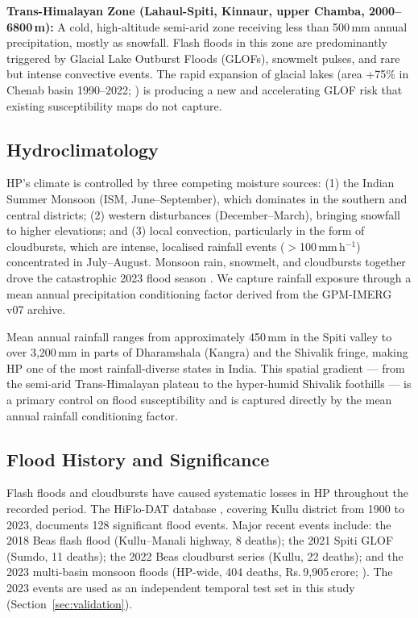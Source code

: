 \textbf{Trans-Himalayan Zone (Lahaul-Spiti, Kinnaur, upper Chamba, 2000--6800\,m):}
A cold, high-altitude semi-arid zone receiving less than 500\,mm annual precipitation,
mostly as snowfall.
Flash floods in this zone are predominantly triggered by Glacial Lake Outburst Floods (GLOFs),
snowmelt pulses, and rare but intense convective events.
The rapid expansion of glacial lakes (area +75\% in Chenab basin 1990--2022;
\citealt{chenab2024glof}) is producing a new and accelerating GLOF risk
that existing susceptibility maps do not capture.

\subsection{Hydroclimatology}
\label{sec:climate}

HP's climate is controlled by three competing moisture sources:
(1) the Indian Summer Monsoon (ISM, June--September), which dominates in the
southern and central districts;
(2) western disturbances (December--March), bringing snowfall to higher elevations; and
(3) local convection, particularly in the form of cloudbursts,
which are intense, localised rainfall events ($>$100\,mm\,h$^{-1}$)
concentrated in July--August.
Monsoon rain, snowmelt, and cloudbursts together drove the catastrophic 2023 flood season
\citep{dixit2026nhess}. We capture rainfall exposure through a mean annual precipitation
conditioning factor derived from the GPM-IMERG v07 archive.

Mean annual rainfall ranges from approximately 450\,mm in the Spiti valley
to over 3,200\,mm in parts of Dharamshala (Kangra) and the Shivalik fringe,
making HP one of the most rainfall-diverse states in India.
This spatial gradient --- from the semi-arid Trans-Himalayan plateau to the
hyper-humid Shivalik foothills --- is a primary control on flood susceptibility
and is captured directly by the mean annual rainfall conditioning factor.

\subsection{Flood History and Significance}
\label{sec:flood_history}

Flash floods and cloudbursts have caused systematic losses in HP throughout
the recorded period.
The HiFlo-DAT database \citep{hiflodot2025}, covering Kullu district from 1900 to 2023,
documents 128 significant flood events.
Major recent events include:
the 2018 Beas flash flood (Kullu--Manali highway, 8 deaths);
the 2021 Spiti GLOF (Sumdo, 11 deaths);
the 2022 Beas cloudburst series (Kullu, 22 deaths);
and the 2023 multi-basin monsoon floods (HP-wide, 404 deaths, Rs.\,9,905\,crore;
\citealt{ndma2023}).
The 2023 events are used as an independent temporal test set in this study
(Section~\ref{sec:validation}).

